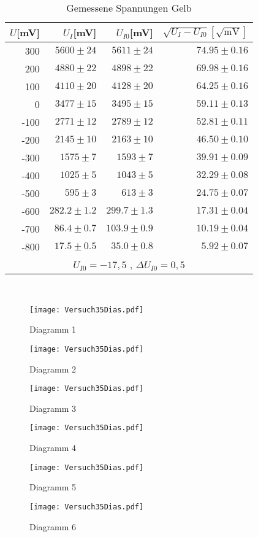 \begin{table}[ht]
  \centering
  \caption{Gemessene Spannungen Gelb}
   \begin{tabular}{r | r | r | r}
    \toprule
    $U$[mV] & $U_I$[mV] & $U_{I0}$[mV] & $\sqrt{U_I  - U_{I0}}[\sqrt{\text{mV}}]$\\
    \midrule
    300   & $5600 \pm 24$ & $5611  \pm24$ & $74.95 \pm 0.16$ \\
    200   &$ 4880 \pm 22 $&$ 4898\pm 22$ & $69.98 \pm 0.16$ \\
    100   & $4110 \pm 20$ & $4128 \pm 20$& $64.25 \pm 0.16$\\
    0     & $3477 \pm 15$ & $3495 \pm 15$ & $59.11 \pm 0.13$ \\
    -100  & $2771 \pm 12 $& $2789 \pm 12$ & $52.81 \pm 0.11$ \\
    -200  & $2145 \pm 10$ &$ 2163 \pm 10$ & $46.50 \pm0.10 $\\
    -300  & $1575 \pm 7$& $1593\pm 7 $& $39.91 \pm 0.09$\\
    -400  & $1025 \pm 5$ & $1043 \pm 5 $& $32.29 \pm 0.08$ \\
    -500  & $595 \pm 3$ & $613 \pm 3$ & $24.75 \pm 0.07 $\\
    -600  & $282.2 \pm 1.2$ & $299.7 \pm 1.3$ &$ 17.31 \pm 0.04$ \\
    -700  & $86.4 \pm 0.7$ & $103.9 \pm 0.9$ & $10.19 \pm 0.04$ \\
    -800  & $17.5  \pm 0.5$ & $35.0  \pm 0.8 $& $5.92 \pm 0.07$ \\
    \bottomrule
    \multicolumn{4}{c}{$U_{I0} = -17,5$ , $\Delta U_{I0} = 0,5$}
    \end{tabular}
\end{table}%
\clearpage
\newpage
\mbox{~}
\clearpage
\newpage


\begin{figure}[h!]
    \centering
    \texttt{[image: Versuch35Dias.pdf]}
    \caption{Diagramm 1}
\end{figure}
\newpage
\begin{figure}[h!]
    \centering
    \texttt{[image: Versuch35Dias.pdf]}
    \caption{Diagramm 2}
\end{figure}
\newpage
\begin{figure}[h!]
    \centering
    \texttt{[image: Versuch35Dias.pdf]}
    \caption{Diagramm 3}
\end{figure}
\newpage
\begin{figure}[h!]
    \centering
    \texttt{[image: Versuch35Dias.pdf]}
    \caption{Diagramm 4}
\end{figure}
\newpage
\begin{figure}[h!]
    \centering
    \texttt{[image: Versuch35Dias.pdf]}
    \caption{Diagramm 5}
\end{figure}
\newpage
\begin{figure}[h!]
    \centering
    \texttt{[image: Versuch35Dias.pdf]}
    \caption{Diagramm 6}
\end{figure}
\newpage

